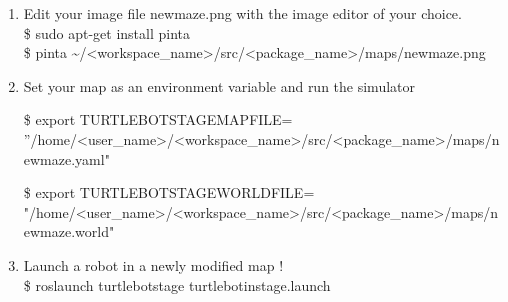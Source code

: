 \documentclass[12pt]{article}
\newcommand{\R}{\color{red}}
\newcommand{\B}{\color{blue}}
\newcommand{\K}{\color{black}}
\newcommand{\G}{\color{mygreen}}
\newcommand{\pkgname}{\G<package\_name>\K}
\newcommand{\wspname}{\R<workspace\_name>\K}
\newcommand{\usrname}{\B<user\_name>\K}
\newcommand{\home}{\textasciitilde/}
\begin{document}
\begin{enumerate}
		{\it change:} 
            {\selectfont
			image: maze.png } \\
		{\it to: }
            {\selectfont
			image: new\textunderscore maze.png } 
	\item Edit your image file new\textunderscore maze.png with the image editor of your choice.\\
{\selectfont \$ sudo apt-get install pinta }\\
    {\selectfont \$ pinta \home\wspname/src/\pkgname/maps/new\textunderscore maze.png }
	\item Set your map as an environment variable and run the simulator
	
		{\selectfont  
        \$ export TURTLEBOT\textunderscore STAGE\textunderscore MAP\textunderscore FILE=\\''/home/\usrname/\wspname/src/\pkgname/maps/new\textunderscore maze.yaml}"
        
		{\selectfont 
        \$ export TURTLEBOT\textunderscore STAGE\textunderscore WORLD\textunderscore FILE=\\"/home/\usrname/\wspname/src/\pkgname/maps/new\textunderscore maze.world}"
        
    \item Launch a robot in a newly modified map !   \vspace{1mm}\\
		{\selectfont   
        \$ roslaunch turtlebot\textunderscore stage turtlebot\textunderscore in\textunderscore stage.launch }

    
\end{enumerate}
\end{document}
